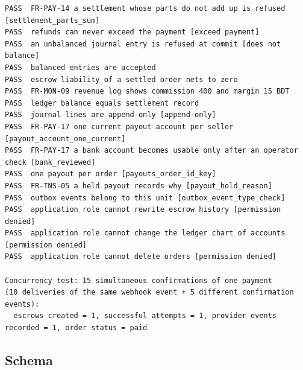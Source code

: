 \documentclass[11pt,a4paper]{article}
\begin{document}
{\begin{verbatim}
PASS  FR-PAY-14 a settlement whose parts do not add up is refused [settlement_parts_sum]
PASS  refunds can never exceed the payment [exceed payment]
PASS  an unbalanced journal entry is refused at commit [does not balance]
PASS  balanced entries are accepted
PASS  escrow liability of a settled order nets to zero
PASS  FR-MON-09 revenue log shows commission 400 and margin 15 BDT
PASS  ledger balance equals settlement record
PASS  journal lines are append-only [append-only]
PASS  FR-PAY-17 one current payout account per seller [payout_account_one_current]
PASS  FR-PAY-17 a bank account becomes usable only after an operator check [bank_reviewed]
PASS  one payout per order [payouts_order_id_key]
PASS  FR-TNS-05 a held payout records why [payout_hold_reason]
PASS  outbox events belong to this unit [outbox_event_type_check]
PASS  application role cannot rewrite escrow history [permission denied]
PASS  application role cannot change the ledger chart of accounts [permission denied]
PASS  application role cannot delete orders [permission denied]

Concurrency test: 15 simultaneous confirmations of one payment
(10 deliveries of the same webhook event + 5 different confirmation events):
  escrows created = 1, successful attempts = 1, provider events recorded = 1, order status = paid
\end{verbatim}
}

\subsection{Schema}

\end{document}
